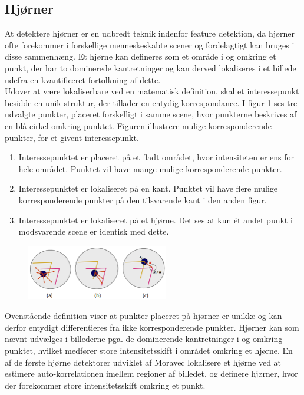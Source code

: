 \subsection{Hjørner}\label{subsec:corner}
At detektere hjørner er en udbredt teknik indenfor feature detektion, da hjørner ofte forekommer i forskellige menneskeskabte scener og fordelagtigt kan bruges i disse sammenhæng. Et hjørne kan defineres som et område i og omkring et punkt, der har to dominerede kantretninger og kan derved lokaliseres i et billede udefra en kvantificeret fortolkning af dette. \\ Udover at være lokaliserbare ved en matematisk definition, skal et interessepunkt besidde en unik struktur, der tillader en entydig korrespondance. I figur \ref{app} ses tre udvalgte punkter, placeret forskelligt i samme scene, hvor punkterne beskrives af en blå cirkel omkring punktet. Figuren illustrere mulige korresponderende punkter, for et givent interessepunkt.
\begin{enumerate}[label=\alph*]
\item{Interessepunktet er placeret på et fladt området, hvor intensiteten er ens for hele området. Punktet vil have mange mulige korresponderende punkter.}
\item{ Interessepunktet er lokaliseret på en kant. Punktet vil have flere mulige korresponderende punkter på den tilsvarende kant i den anden figur.}
\item{Interessepunktet er lokaliseret på et hjørne. Det ses at kun ét andet punkt i modsvarende scene er identisk med dette.}
\end{enumerate}
\begin{figure}[H]
    \centering
    \includegraphics[width=0.55\textwidth]{fig/37.png}
    \vspace{-1em}   
    \begin{center}    
    \caption{\textcolor{gray}{\footnotesize \textit{
 }}}
    \label{app}
     \end{center}
    \vspace{-2.7em}  
  \end{figure}  
\noindent
Ovenstående definition viser at punkter placeret på hjørner er unikke og kan derfor entydigt differentieres fra ikke korresponderende punkter. Hjørner kan som nævnt udvælges i billederne pga. de dominerende kantretninger i og omkring punktet, hvilket medfører store intensitetsskift i området omkring et hjørne. En af de første hjørne detektorer udviklet af Moravec \cite{Moravec} lokalisere et hjørne ved at estimere auto-korrelationen imellem regioner af billedet, og definere hjørner, hvor der forekommer store intensitetsskift omkring et punkt.